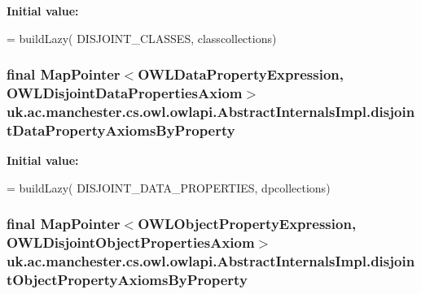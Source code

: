 {\bfseries Initial value\-:}
\begin{DoxyCode}
= buildLazy(
            DISJOINT\_CLASSES, classcollections)
\end{DoxyCode}
\hypertarget{classuk_1_1ac_1_1manchester_1_1cs_1_1owl_1_1owlapi_1_1_abstract_internals_impl_adb9089e9391c3964747a39fa76d4da4e}{
\subsubsection[{disjoint\-Data\-Property\-Axioms\-By\-Property}]{\setlength{\rightskip}{0pt plus 5cm}final Map\-Pointer$<${\bf O\-W\-L\-Data\-Property\-Expression}, {\bf O\-W\-L\-Disjoint\-Data\-Properties\-Axiom}$>$ uk.\-ac.\-manchester.\-cs.\-owl.\-owlapi.\-Abstract\-Internals\-Impl.\-disjoint\-Data\-Property\-Axioms\-By\-Property\hspace{0.3cm}{\ttfamily [protected]}}}\label{classuk_1_1ac_1_1manchester_1_1cs_1_1owl_1_1owlapi_1_1_abstract_internals_impl_adb9089e9391c3964747a39fa76d4da4e}
{\bfseries Initial value\-:}
\begin{DoxyCode}
= buildLazy(
            DISJOINT\_DATA\_PROPERTIES, dpcollections)
\end{DoxyCode}
\hypertarget{classuk_1_1ac_1_1manchester_1_1cs_1_1owl_1_1owlapi_1_1_abstract_internals_impl_af301c1193cde0e87759d0bb72c145243}{
\subsubsection[{disjoint\-Object\-Property\-Axioms\-By\-Property}]{\setlength{\rightskip}{0pt plus 5cm}final Map\-Pointer$<${\bf O\-W\-L\-Object\-Property\-Expression}, {\bf O\-W\-L\-Disjoint\-Object\-Properties\-Axiom}$>$ uk.\-ac.\-manchester.\-cs.\-owl.\-owlapi.\-Abstract\-Internals\-Impl.\-disjoint\-Object\-Property\-Axioms\-By\-Property\hspace{0.3cm}{\ttfamily [protected]}}}\label{classuk_1_1ac_1_1manchester_1_1cs_1_1owl_1_1owlapi_1_1_abstract_internals_impl_af301c1193cde0e87759d0bb72c145243}
